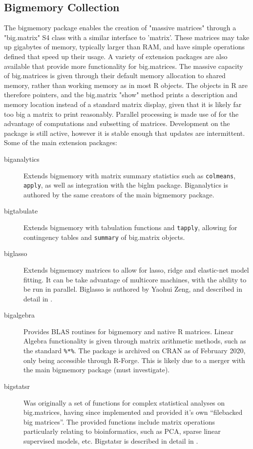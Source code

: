 \documentclass[a4paper,10pt]{article}
\begin{document}
\subsection{Bigmemory Collection}
\label{sec:bigmemory-collection}

The bigmemory package enables the creation of "massive matrices"
through a "big.matrix" S4 class with a similar interface to
'matrix'\cite{kane13:bigmemory}. These matrices may take up gigabytes
of memory, typically larger than RAM, and have simple operations
defined that speed up their usage. A variety of extension packages are
also available that provide more functionality for big.matrices. The
massive capacity of big.matrices is given through their default memory
allocation to shared memory, rather than working memory as in most R
objects. The objects in R are therefore pointers, and the big.matrix
"show" method prints a description and memory location instead of a
standard matrix display, given that it is likely far too big a matrix
to print reasonably. Parallel processing is made use of for the
advantage of computations and subsetting of matrices. Development on
the package is still active, however it is stable enough that updates
are intermittent. Some of the main extension packages:

\begin{description}
	\item[biganalytics] Extends bigmemory with matrix summary statistics
	      such as \texttt{colmeans}, \texttt{apply}, as well as integration
	      with the biglm package\cite{emerson16}. Biganalytics is authored by
	      the same creators of the main bigmemory package.
	\item[bigtabulate] Extends bigmemory with tabulation functions and
	      \texttt{tapply}, allowing for contingency tables and
	      \texttt{summary} of big.matrix objects\parencite{kane16}.
	\item[biglasso] Extends bigmemory matrices to allow for lasso, ridge
	      and elastic-net model fitting. It can be take advantage of multicore
	      machines, with the ability to be run in parallel. Biglasso is
	      authored by Yaohui Zeng, and described in detail in
	      \textcite{zeng2017biglasso}.
	\item[bigalgebra] Provides BLAS routines for bigmemory and native R
	      matrices. Linear Algebra functionality is given through matrix
	      arithmetic methods, such as the standard \texttt{\%*\%}. The package
	      is archived on CRAN as of February 2020, only being accessible
	      through R-Forge. This is likely due to a merger with the main
	      bigmemory package (must investigate).
	\item[bigstatsr] Was originally a set of functions for complex
		statistical analyses on big.matrices, having since implemented
		and provided it's own ``filebacked big
		matrices''\cite{prive2018efficient}. The provided functions
		include matrix operations particularly relating to
		bioinformatics, such as PCA, sparse linear supervised models,
		etc.  Bigstatsr is described in detail in
		\textcite{prive2018efficient}.
\end{description}
\end{document}

